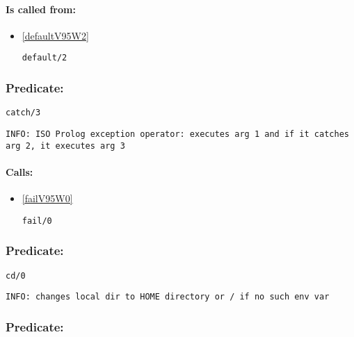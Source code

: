 \paragraph{Is called from:} 
\begin{itemize}
\item \ref{defaultV95W2} 
\begin{verbatim}
default/2
\end{verbatim}

\end{itemize}

\subsubsection{Predicate:} \label{catchV95W3}

\begin{verbatim}
catch/3
\end{verbatim}

{\small \begin{verbatim}
INFO: ISO Prolog exception operator: executes arg 1 and if it catches arg 2, it executes arg 3

\end{verbatim}}
\paragraph{Calls:} 
\begin{itemize}
\item \ref{failV95W0} 
\begin{verbatim}
fail/0
\end{verbatim}

\end{itemize}

\subsubsection{Predicate:} \label{cdV95W0}

\begin{verbatim}
cd/0
\end{verbatim}

{\small \begin{verbatim}
INFO: changes local dir to HOME directory or / if no such env var

\end{verbatim}}

\subsubsection{Predicate:} \label{cdV95W1}


